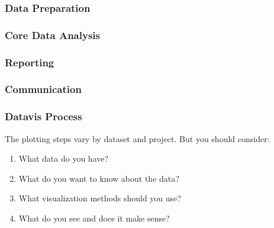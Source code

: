 \documentclass[12pt]{beamer}\usepackage[]{graphicx}\usepackage[]{color}
\begin{document}

\begin{frame}[fragile]
\frametitle{Data Preparation}
\begin{center}
\end{center}
\end{frame}


\begin{frame}[fragile]
\frametitle{Core Data Analysis}
\begin{center}
\end{center}
\end{frame}


\begin{frame}[fragile]
\frametitle{Reporting}
\begin{center}
\end{center}
\end{frame}


\begin{frame}[fragile]
\frametitle{Communication}
\begin{center}
\end{center}
\end{frame}


\begin{frame}[fragile]
\begin{center}
\end{center}
\end{frame}


\begin{frame}
\begin{center}
\Huge{}
\end{center}
\end{frame}


\begin{frame}
\frametitle{Datavis Process}

The plotting steps vary by dataset and project. But you should consider:
\begin{enumerate}
  \item What data do you have?
  \item What do you want to know about the data?
  \item What visualization methods should you use?
  \item What do you see and does it make sense?
\end{enumerate}
\eb

\end{frame}
\end{document}
